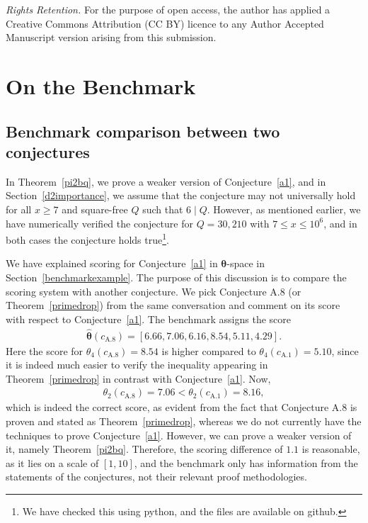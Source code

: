 \documentclass[11pt,reqno]{amsart}
\theoremstyle{plain}\newtheorem{theorem}{Theorem}[section]
\numberwithin{equation}{section}
\begin{document}
\medskip
\noindent
{\it Rights Retention.} For the purpose of open access, the author has applied a Creative Commons Attribution (CC BY) licence to any Author Accepted Manuscript version arising from
this submission.

\appendix

\section{On the Benchmark}\label{appendix}
\noindent


\subsection{Benchmark comparison between two conjectures}
\noindent
In Theorem~\ref{pi2bq}, we prove a weaker version of Conjecture~\ref{a1}, and in Section~\ref{d2importance}, we assume that the conjecture may not universally hold for all $x\geq 7$ and square-free $Q$ such that $6 \mid Q$. However, as mentioned earlier, we have numerically verified the conjecture for $Q=30,210$ with $7\leq x\leq 10^6$, and in both cases the conjecture holds true\footnote{We have checked this using python, and the files are available on github.}.


\medskip
\noindent
We have explained scoring for Conjecture~\ref{a1} in $\bm{\theta}$-space in Section~\ref{benchmarkexample}. The purpose of this discussion is to compare the scoring system with another conjecture. We pick Conjecture A.8 (or Theorem~\ref{primedrop}) from the same conversation and comment on its score with respect to Conjecture~\ref{a1}. The benchmark assigns the score
\begin{align*}
\hat{\bm{\theta}}(c_{\mathrm{A.8}})
=[6.66, 7.06, 6.16, 8.54, 5.11, 4.29].
\end{align*}
\noindent
Here the score for $\theta_4(c_{\mathrm{A.8}})=8.54$ is higher compared to $\theta_4(c_{\mathrm{A.1}})=5.10$, since it is indeed much easier to verify the inequality appearing in Theorem~\ref{primedrop} in contrast with Conjecture~\ref{a1}. Now,
\begin{align*}
\theta_2(c_{\mathrm{A.8}})=7.06<\theta_2(c_{\mathrm{A.1}})=8.16,
\end{align*}
which is indeed the correct score, as evident from the fact that Conjecture A.8 is proven and stated as Theorem~\ref{primedrop}, whereas we do not currently have the techniques to prove Conjecture~\ref{a1}. However, we can prove a weaker version of it, namely Theorem~\ref{pi2bq}. Therefore, the scoring difference of $1.1$ is reasonable, as it lies on a scale of $[1,10]$, and the benchmark only has information from the statements of the conjectures, not their relevant proof methodologies.
\end{document}
